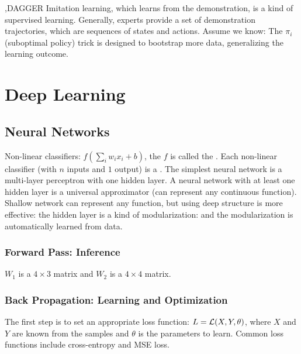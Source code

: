 \documentclass[12pt]{report}
\begin{document}
\sep{DAGGER}
Imitation learning, which learns from the demonstration, is a kind of supervised learning. Generally, experts provide a set of demonstration trajectories, which are sequences of states
and actions. Assume we know:
The $\pi_i$ (suboptimal policy) trick is designed to bootstrap more data, generalizing the learning outcome.

\clearpage
\section{Deep Learning}

\subsection{Neural Networks}
Non-linear classifiers: $f(\sum_i w_ix_i+b)$, the $f$ is called the . Each non-linear classifier 
(with $n$ inputs and $1$ output) is a .
The simplest neural network is a multi-layer perceptron with one hidden layer. A neural network with at least one hidden layer is a universal approximator
(can represent any continuous function). Shallow network can represent any function, but using deep structure is more effective: the hidden layer is a kind of 
modularization: and the modularization is automatically learned from data.

\subsubsection{Forward Pass: Inference}
$W_1$ is a $4\times 3$ matrix and $W_2$ is a $4\times 4$ matrix.
\subsubsection{Back Propagation: Learning and Optimization}
The first step is to set an appropriate loss function: $L=\mathcal{L}(X,Y,\theta)$, where $X$ and $Y$ are known from the samples and $\theta$ is the parameters to learn. 
Common loss functions include cross-entropy and MSE loss.
\end{document}
